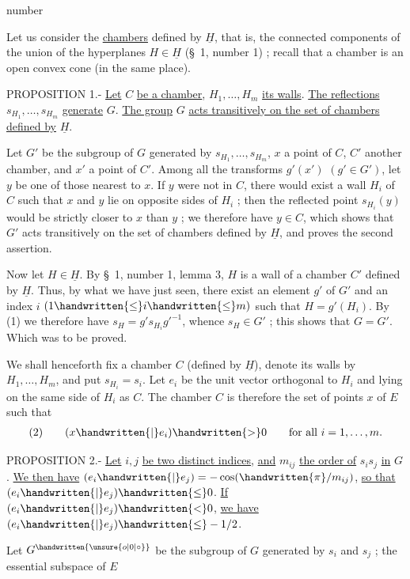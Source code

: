 \begin{flushright}number \end{flushright}
Let us consider the \uline{chambers} defined by $\underline{H}$, that is, the connected components of the union of the hyperplanes $H\in\underline{H}$ (\S\ 1, number 1) ; recall that a chamber is an open convex cone (in the same place).

PROPOSITION 1.- \uline{Let} $C$ \uline{be a chamber}, $H_1,\ldots,H_m$ \uline{its walls}. \uline{The reflections} $s_{H_1},\ldots,s_{H_m}$ \uline{generate} $G$. \uline{The group} $G$ \uline{acts transitively on the set of chambers defined by} $\underline{H}$.

Let $G'$ be the subgroup of $G$ generated by $s_{H_1},\ldots,s_{H_m}$, $x$ a point of $C$, $C'$ another chamber, and $x'$ a point of $C'$. Among all the transforms $g'(x')$ $(g'\in G')$, let $y$ be one of those nearest to $x$. If $y$ were not in $C$, there would exist a wall $H_i$ of $C$ such that $x$ and $y$ lie on opposite sides of $H_i$ ; then the reflected point $s_{H_i}(y)$ would be strictly closer to $x$ than $y$ ; we therefore have $y\in C$, which shows that $G'$ acts transitively on the set of chambers defined by $\underline{H}$, and proves the second assertion.

Now let $H\in\underline{H}$. By \S\ 1, number 1, lemma 3, $H$ is a wall of a chamber $C'$ defined by $\underline{H}$. Thus, by what we have just seen, there exist an element $g'$ of $G'$ and an index $i$ $(1\handwritten{\leq}i\handwritten{\leq}m)$ such that $H=g'(H_i)$. By (1) we therefore have $s_H=g's_{H_i}{g'}^{-1}$, whence $s_H\in G'$ ; this shows that $G=G'$. Which was to be proved.

We shall henceforth fix a chamber $C$ (defined by $\underline{H}$), denote its walls by $H_1,\ldots,H_m$, and put $s_{H_i}=s_i$. Let $e_i$ be the unit vector orthogonal to $H_i$ and lying on the same side of $H_i$ as $C$. The chamber $C$ is therefore the set of points $x$ of $E$ such that
\[
\begin{array}{l@{\qquad}l}(2)&(x\handwritten{|}e_i)\handwritten{>}0\qquad\text{for all }i=1,\ldots,m.\end{array}
\]

PROPOSITION 2.- \uline{Let} $i,j$ \uline{be two distinct indices}, \uline{and} $m_{ij}$ \uline{the order of} $s_i s_j$ \uline{in} $G$. \uline{We then have} $(e_i\handwritten{|}e_j)=-\cos(\handwritten{\pi}/m_{ij})$, \uline{so that} $(e_i\handwritten{|}e_j)\handwritten{\leq}0$. \uline{If} $(e_i\handwritten{|}e_j)\handwritten{<}0$, \uline{we have} $(e_i\handwritten{|}e_j)\handwritten{\leq}-1/2$.

Let $G^{\handwritten{\unsure{o|0|\circ}}}$ be the subgroup of $G$ generated by $s_i$ and $s_j$ ; the essential subspace of $E$
